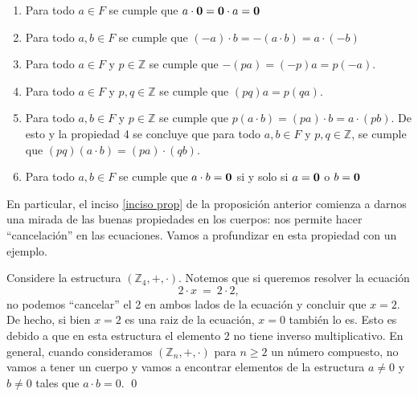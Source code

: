 \begin{proposition}\label{proposicion cuerpos}
\hfill
\begin{enumerate}
\item Para todo $a\in F$ se cumple que $a\cdot \mathbf{0} =\mathbf{0}\cdot a= \mathbf{0}$

\item Para todo $a,b\in F$ se cumple que $(-a)\cdot b=-(a\cdot b) = a\cdot (-b)$

\item Para todo $a \in F$ y $p \in \mathbb{Z}$ se cumple que $-(pa) = (-p)a = p(-a)$.

\item Para todo $a \in F$ y $p,q \in \mathbb{Z}$ se cumple que $(pq)a = p(qa)$.

\item Para todo $a,b\in F$ y $p \in \mathbb{Z}$ se cumple que $p(a\cdot b) = (pa)\cdot b = a \cdot (pb)$. De esto y la propiedad 4 se concluye que para todo $a,b\in F$ y $p,q \in \mathbb{Z}$, se cumple que $(pq)(a\cdot b) = (pa)\cdot (qb)$.

\item Para todo $a,b\in F$ se cumple que $a\cdot b = \mathbf{0}$ si y solo si $a=\mathbf{0}$ o $b=\mathbf{0}$\label{inciso prop}

\end{enumerate}
\end{proposition}
En particular, el inciso \ref{inciso prop} de la proposición anterior comienza a darnos una mirada de las buenas propiedades en los cuerpos: nos permite hacer ``cancelación'' en las ecuaciones. Vamos a profundizar en esta propiedad con un ejemplo.
\begin{example}
Considere la estructura $(\mathbb{Z}_4,+,\cdot)$. Notemos que si
queremos resolver la ecuación $$ 2\cdot x\ = \ 2\cdot 2,$$ no podemos
``cancelar'' el 2 en ambos lados de la ecuación y concluir que $x =
2$. De hecho, si bien $x =2$ es una raiz de la ecuación, $x=0$ también
lo es. Esto es debido a que en esta estructura el elemento $2$ no
tiene inverso multiplicativo.  En general, cuando consideramos
$(\mathbb{Z}_n,+,\cdot)$ para $n \geq 2$ un número compuesto, no vamos
a tener un cuerpo y
vamos a encontrar elementos de la estructura $a\neq 0$ y $b\neq 0$
tales que $a\cdot b = 0$. \qed
\end{example}
